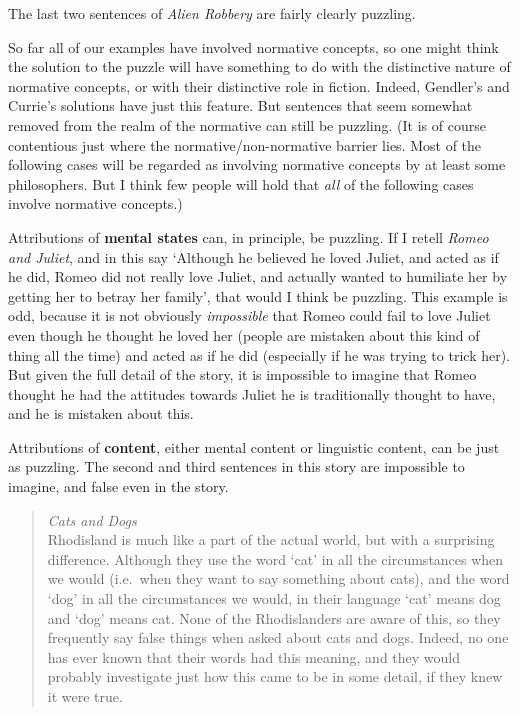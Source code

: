 \documentclass[
  11pt,
  letterpaper,
  DIV=11,
  numbers=noendperiod,
  twoside]{scrartcl}
\begin{document}
The last two sentences of \emph{Alien Robbery} are fairly clearly
puzzling.

So far all of our examples have involved normative concepts, so one
might think the solution to the puzzle will have something to do with
the distinctive nature of normative concepts, or with their distinctive
role in fiction. Indeed, Gendler's and Currie's solutions have just this
feature. But sentences that seem somewhat removed from the realm of the
normative can still be puzzling. (It is of course contentious just where
the normative/non-normative barrier lies. Most of the following cases
will be regarded as involving normative concepts by at least some
philosophers. But I think few people will hold that \emph{all} of the
following cases involve normative concepts.)

Attributions of \textbf{mental states} can, in principle, be puzzling.
If I retell \emph{Romeo and Juliet}, and in this say `Although he
believed he loved Juliet, and acted as if he did, Romeo did not really
love Juliet, and actually wanted to humiliate her by getting her to
betray her family', that would I think be puzzling. This example is odd,
because it is not obviously \emph{impossible} that Romeo could fail to
love Juliet even though he thought he loved her (people are mistaken
about this kind of thing all the time) and acted as if he did
(especially if he was trying to trick her). But given the full detail of
the story, it is impossible to imagine that Romeo thought he had the
attitudes towards Juliet he is traditionally thought to have, and he is
mistaken about this.

Attributions of \textbf{content}, either mental content or linguistic
content, can be just as puzzling. The second and third sentences in this
story are impossible to imagine, and false even in the story.

\begin{quote}
\emph{Cats and Dogs}\\
Rhodisland is much like a part of the actual world, but with a
surprising difference. Although they use the word `cat' in all the
circumstances when we would (i.e.~when they want to say something about
cats), and the word `dog' in all the circumstances we would, in their
language `cat' means dog and `dog' means cat. None of the Rhodislanders
are aware of this, so they frequently say false things when asked about
cats and dogs. Indeed, no one has ever known that their words had this
meaning, and they would probably investigate just how this came to be in
some detail, if they knew it were true.
\end{quote}
\end{document}
